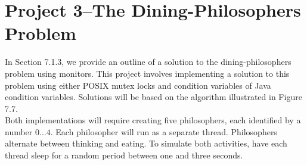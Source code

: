 \documentclass[12pt]{article}
\begin{document}
    \newpage
    \section*{Project 3--The Dining-Philosophers Problem}
    In Section 7.1.3, we provide an outline of a solution to the dining-philosophers problem using monitors. This project involves implementing a solution to this problem using either POSIX mutex locks and condition variables of Java condition variables. Solutions will be based on the algorithm illustrated in Figure 7.7.\\
    Both implementations will require creating five philosophers, each identified by a number $0\dots 4$. Each philosopher will run as a separate thread. Philosophers alternate between thinking and eating. To simulate both activities, have each thread sleep for a random period between one and three seconds.
\end{document}
